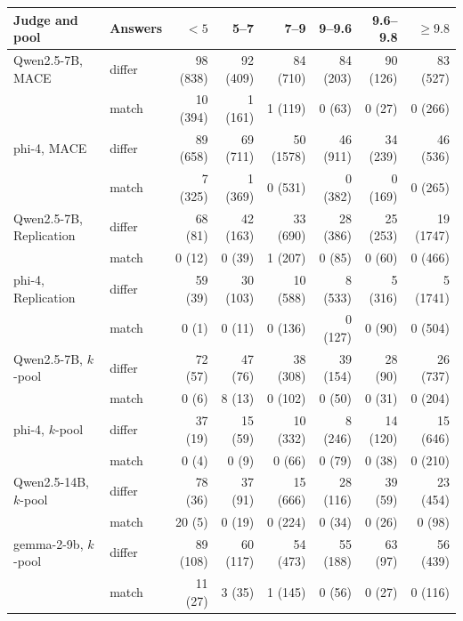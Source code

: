 \begin{tabular}{llrrrrrr}
\toprule
Judge and pool & Answers & $<5$ & 5--7 & 7--9 & 9--9.6 & 9.6--9.8 & $\geq 9.8$ \\
\midrule
Qwen2.5-7B, \textsc{MACE} & differ & 98 (838) & 92 (409) & 84 (710) & 84 (203) & 90 (126) & 83 (527) \\
 & match & 10 (394) & 1 (161) & 1 (119) & 0 (63) & 0 (27) & 0 (266) \\
phi-4, \textsc{MACE} & differ & 89 (658) & 69 (711) & 50 (1578) & 46 (911) & 34 (239) & 46 (536) \\
 & match & 7 (325) & 1 (369) & 0 (531) & 0 (382) & 0 (169) & 0 (265) \\
Qwen2.5-7B, Replication & differ & 68 (81) & 42 (163) & 33 (690) & 28 (386) & 25 (253) & 19 (1747) \\
 & match & 0 (12) & 0 (39) & 1 (207) & 0 (85) & 0 (60) & 0 (466) \\
phi-4, Replication & differ & 59 (39) & 30 (103) & 10 (588) & 8 (533) & 5 (316) & 5 (1741) \\
 & match & 0 (1) & 0 (11) & 0 (136) & 0 (127) & 0 (90) & 0 (504) \\
Qwen2.5-7B, $k$-pool & differ & 72 (57) & 47 (76) & 38 (308) & 39 (154) & 28 (90) & 26 (737) \\
 & match & 0 (6) & 8 (13) & 0 (102) & 0 (50) & 0 (31) & 0 (204) \\
phi-4, $k$-pool & differ & 37 (19) & 15 (59) & 10 (332) & 8 (246) & 14 (120) & 15 (646) \\
 & match & 0 (4) & 0 (9) & 0 (66) & 0 (79) & 0 (38) & 0 (210) \\
Qwen2.5-14B, $k$-pool & differ & 78 (36) & 37 (91) & 15 (666) & 28 (116) & 39 (59) & 23 (454) \\
 & match & 20 (5) & 0 (19) & 0 (224) & 0 (34) & 0 (26) & 0 (98) \\
gemma-2-9b, $k$-pool & differ & 89 (108) & 60 (117) & 54 (473) & 55 (188) & 63 (97) & 56 (439) \\
 & match & 11 (27) & 3 (35) & 1 (145) & 0 (56) & 0 (27) & 0 (116) \\
\bottomrule
\end{tabular}
